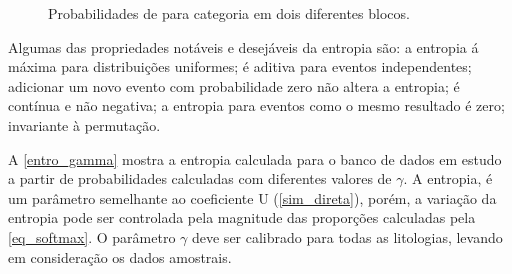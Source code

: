 \begin{figure}[H] 
\caption{Probabilidades de para categoria em dois diferentes blocos.} \label{entro_block}
     \centering
\end{figure}

Algumas das propriedades notáveis e desejáveis da entropia são: a entropia á máxima para distribuições uniformes; é aditiva para eventos independentes; adicionar um novo evento com probabilidade zero não altera a entropia; é contínua e não negativa; a entropia para eventos como o mesmo resultado é zero; invariante à permutação.

A \autoref{entro_gamma} mostra a entropia calculada para o banco de dados em estudo a partir de probabilidades calculadas com diferentes valores de $\gamma$. A entropia, é um parâmetro semelhante ao coeficiente U (\autoref{sim_direta}), porém, a variação da entropia pode ser controlada pela magnitude das proporções calculadas pela \autoref{eq_softmax}. O parâmetro $\gamma$ deve ser calibrado para todas as litologias, levando em consideração os dados amostrais. 


